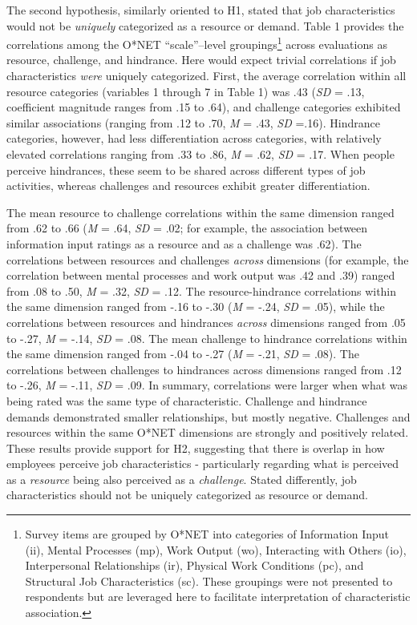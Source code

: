 \documentclass[
  man]{apa7}
\begin{document}
The second hypothesis, similarly oriented to H1, stated that job characteristics would not be \emph{uniquely} categorized as a resource or demand. Table 1 provides the correlations among the O*NET ``scale''--level groupings\footnote{Survey items are grouped by O*NET into categories of Information Input (ii), Mental Processes (mp), Work Output (wo), Interacting with Others (io), Interpersonal Relationships (ir), Physical Work Conditions (pc), and Structural Job Characteristics (sc). These groupings were not presented to respondents but are leveraged here to facilitate interpretation of characteristic association.} across evaluations as resource, challenge, and hindrance. Here would expect trivial correlations if job characteristics \emph{were} uniquely categorized. First, the average correlation within all resource categories (variables 1 through 7 in Table 1) was .43 (\emph{SD} = .13, coefficient magnitude ranges from .15 to .64), and challenge categories exhibited similar associations (ranging from .12 to .70, \emph{M} = .43, \emph{SD} =.16). Hindrance categories, however, had less differentiation across categories, with relatively elevated correlations ranging from .33 to .86, \emph{M} = .62, \emph{SD} = .17. When people perceive hindrances, these seem to be shared across different types of job activities, whereas challenges and resources exhibit greater differentiation.

The mean resource to challenge correlations within the same dimension ranged from .62 to .66 (\emph{M} = .64, \emph{SD} = .02; for example, the association between information input ratings as a resource and as a challenge was .62). The correlations between resources and challenges \emph{across} dimensions (for example, the correlation between mental processes and work output was .42 and .39) ranged from .08 to .50, \emph{M} = .32, \emph{SD} = .12. The resource-hindrance correlations within the same dimension ranged from -.16 to -.30 (\emph{M} = -.24, \emph{SD} = .05), while the correlations between resources and hindrances \emph{across} dimensions ranged from .05 to -.27, \emph{M} = -.14, \emph{SD} = .08. The mean challenge to hindrance correlations within the same dimension ranged from -.04 to -.27 (\emph{M} = -.21, \emph{SD} = .08). The correlations between challenges to hindrances across dimensions ranged from .12 to -.26, \emph{M} = -.11, \emph{SD} = .09. In summary, correlations were larger when what was being rated was the same type of characteristic. Challenge and hindrance demands demonstrated smaller relationships, but mostly negative. Challenges and resources within the same O*NET dimensions are strongly and positively related. These results provide support for H2, suggesting that there is overlap in how employees perceive job characteristics - particularly regarding what is perceived as a \emph{resource} being also perceived as a \emph{challenge}. Stated differently, job characteristics should not be uniquely categorized as resource or demand.
\end{document}
